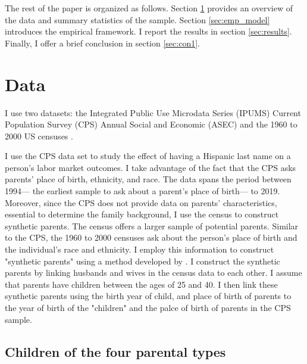 \documentclass[12pt,english]{article}
\begin{document}
The rest of the paper is organized as follows. Section \ref{sec:data} provides an overview of the data and summary statistics of the sample. Section \ref{sec:emp_model} introduces the empirical framework. I report the results in section \ref{sec:results}. Finally, I offer a brief conclusion in section \ref{sec:con1}.

\section{Data}\label{sec:data}

I use two datasets:  the Integrated Public Use Microdata Series (IPUMS) Current Population Survey (CPS) Annual Social and Economic (ASEC) \autocite{cps2019} and the 1960 to 2000 US censuses \autocite{acs2019}. 

I use the CPS data set to study the effect of having a Hispanic last name on a person's labor market outcomes. I take advantage of the fact that the CPS asks parents' place of birth, ethnicity, and race. The data spans the period between 1994--- the earliest sample to ask about a parent's place of birth--- to 2019. Moreover, since the CPS does not provide data on parents' characteristics, essential to determine the family background, I use the census to construct synthetic parents. The census offers a larger sample of potential parents. Similar to the CPS, the 1960 to 2000 censuses ask about the person's place of birth and the individual's race and ethnicity. I employ this information to construct "synthetic parents" using a method developed by \textcite{rubinstein2014pride}. I construct the synthetic parents by linking husbands and wives in the census data to each other. I assume that parents have children between the ages of 25 and 40. I then link these synthetic parents using the birth year of child, and place of birth of parents to the year of birth of the "children" and the palce of birth of parents in the CPS sample.

\subsection{Children of the four parental types}
\end{document}
